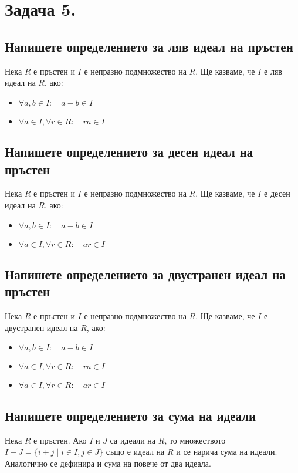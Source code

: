 \documentclass[10pt]{article}
\begin{document}
\section*{Задача 5.}

\subsection*{Напишете определението за ляв идеал на пръстен}
Нека $R$ е пръстен и $I$ е непразно подмножество на $R$. Ще казваме, че $I$ е ляв идеал на $R$, ако:
\begin{itemize}
	\item $\forall a, b \in I: \quad a - b \in I$
	\item $\forall a \in I, \forall r \in R: \quad ra \in I$
\end{itemize}

\subsection*{Напишете определението за десен идеал на пръстен}
Нека $R$ е пръстен и $I$ е непразно подмножество на $R$. Ще казваме, че $I$ е десен идеал на $R$, ако:
\begin{itemize}
	\item $\forall a, b \in I: \quad a - b \in I$
	\item $\forall a \in I, \forall r \in R: \quad ar \in I$
\end{itemize}

\subsection*{Напишете определението за двустранен идеал на пръстен}
Нека $R$ е пръстен и $I$ е непразно подмножество на $R$. Ще казваме, че $I$ е двустранен идеал на $R$, ако:
\begin{itemize}
	\item $\forall a, b \in I: \quad a - b \in I$
	\item $\forall a \in I, \forall r \in R: \quad ra \in I$
	\item $\forall a \in I, \forall r \in R: \quad ar \in I$
\end{itemize}

\subsection*{Напишете определението за сума на идеали}
Нека $R$ е пръстен. Ако $I$ и $J$ са идеали на $R$, то множеството $I + J = \{i + j \mid i \in I, j \in J\}$ също е идеал на $R$ и се нарича сума на идеали. Аналогично се дефинира и сума на повече от два идеала.
\end{document}
